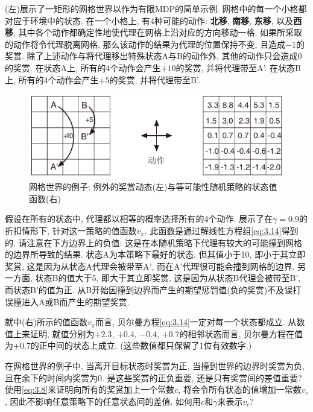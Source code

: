 \hypertarget{exam:3.5}{}
\begin{exam}[网格世界]
(左)展示了一矩形的网格世界以作为有限MDP的简单示例. 网格中的每一个小格都对应于环境中的状态. 在一个小格上, 有4种可能的动作: \textbf{北移}, \textbf{南移}, \textbf{东移}, 以及\textbf{西移}, 其中各个动作都确定性地使代理在网格上沿对应的方向移动一格. 如果所采取的动作将令代理脱离网格, 那么该动作的结果为代理的位置保持不变, 且造成$-1$的奖赏. 除了上述动作与将代理移出特殊状态\textsf{A}与\textsf{B}的动作外, 其他的动作只会造成0的奖赏. 在状态\textsf{A}上, 所有的4个动作会产生$+10$的奖赏, 并将代理带至\textsf{A'}. 在状态\textsf{B}上, 所有的4个动作会产生$+5$的奖赏, 并将代理带至\textsf{B'}.

\begin{figure}[htb]
\centering
\includegraphics[width=.8\textwidth]{c3/img/figure3-2.pdf}
\caption{网格世界的例子: 例外的奖赏动态(左)与等可能性随机策略的状态值函数(右)}\label{fig:3.2}
\end{figure}

假设在所有的状态中, 代理都以相等的概率选择所有的4个动作. 展示了在$\gamma = 0.9$的折扣情形下, 针对这一策略的值函数$v_{\pi}$. 此函数是通过解线性方程组\eqref{eq:3.14}得到的. 请注意在下方边界上的负值: 这是在本随机策略下代理有较大的可能撞到网格的边界所导致的结果. 状态\textsf{A}为本策略下最好的状态, 但其值小于10, 即小于其立即奖赏, 这是因为从状态\textsf{A}代理会被带至\textsf{A'}, 而在\textsf{A'}代理很可能会撞到网格的边界. 另一方面, 状态\textsf{B}的值大于5, 即大于其立即奖赏, 这是因为从状态\textsf{B}代理会被带至\textsf{B'}, 而状态\textsf{B'}的值为正. 从B开始因撞到边界而产生的期望惩罚值(负的奖赏)不及误打误撞进入\textsf{A}或\textsf{B}而产生的期望奖赏.
\end{exam}

\begin{exer}
就中(右)所示的值函数$v_{\pi}$而言, 贝尔曼方程\eqref{eq:3.14}一定对每一个状态都成立. 从数值上来证明, 就值分别为$+2.3$, $+0.4$, $-0.4$, $+0.7$的相邻状态而言, 贝尔曼方程在值为$+0.7$的正中间的状态上成立. (这些数值都只保留了1位有效数字.)
\end{exer}

\begin{exer}
在网格世界的例子中, 当离开目标状态时奖赏为正, 当撞到世界的边界时奖赏为负, 且在余下的时间内奖赏为0. 是这些奖赏的正负重要, 还是只有奖赏间的差值重要? 使用\eqref{eq:3.8}来证明向所有的奖赏加上一个常数$c$, 将会令所有状态的值增加一常数$v_c$, 因此不影响任意策略下的任意状态间的差值. 如何用$c$和$\gamma$来表示$v_c$?
\end{exer}

